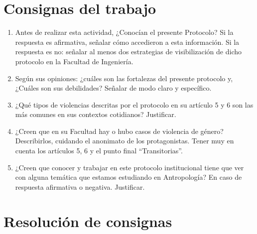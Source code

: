\documentclass[12pt, a4paper]{article}
\begin{document}
    

  \section*{Consignas del trabajo}

    \begin{enumerate}

      \item Antes de realizar esta actividad, ¿Conocían el presente Protocolo? Si la respuesta es afirmativa, señalar cómo accedieron a esta información. Si la respuesta es no: señalar al menos dos estrategias de visibilización de dicho protocolo en la Facultad de Ingeniería.

      \item Según sus opiniones: ¿cuáles son las fortalezas del presente protocolo y, ¿Cuáles son sus debilidades? Señalar de modo claro y específico.

      \item ¿Qué tipos de violencias descritas por el protocolo en su artículo 5 y 6 son las más comunes en sus contextos cotidianos? Justificar.

      \item ¿Creen que en su Facultad hay o hubo casos de violencia de género? Describirlos, cuidando el anonimato de los protagonistas. Tener muy en cuenta los artículos 5, 6 y el punto final “Transitorias”.

      \item ¿Creen que conocer y trabajar en este protocolo institucional tiene que ver con alguna temática que estamos estudiando en Antropología? En caso de respuesta afirmativa o negativa. Justificar.

  \end{enumerate}

  \vspace{1.5cm}

  \section*{Resolución de consignas}
    
\end{document}
